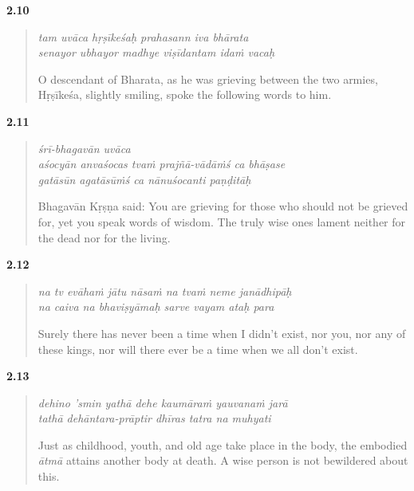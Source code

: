 \par\noindent\textbf{2.10}\par
\begin{verse}
\textit{tam uvāca hṛṣīkeśaḥ prahasann iva bhārata} \\
\textit{senayor ubhayor madhye viṣīdantam idaṁ vacaḥ}

\noindent O descendant of Bharata, as he was grieving between the two armies, Hṛṣīkeśa, slightly smiling, spoke the following words to him.
\end{verse}
\par



\par\noindent\textbf{2.11}\par
\begin{verse}
\textit{śrī-bhagavān uvāca} \\
\textit{aśocyān anvaśocas tvaṁ prajñā-vādāṁś ca bhāṣase} \\
\textit{gatāsūn agatāsūṁś ca nānuśocanti paṇḍitāḥ}

\noindent Bhagavān Kṛṣṇa said: You are grieving for those who should not be grieved for, yet you speak words of wisdom. The truly wise ones lament neither for the dead nor for the living.
\end{verse}
\par



\par\noindent\textbf{2.12}\par
\begin{verse}
\textit{na tv evāhaṁ jātu nāsaṁ na tvaṁ neme janādhipāḥ} \\
\textit{na caiva na bhaviṣyāmaḥ sarve vayam ataḥ para}

\noindent Surely there has never been a time when I didn't exist, nor you, nor any of these kings, nor will there ever be a time when we all don't exist.
\end{verse}
\par



\par\noindent\textbf{2.13}\par
\begin{verse}
\textit{dehino ’smin yathā dehe kaumāraṁ yauvanaṁ jarā} \\
\textit{tathā dehāntara-prāptir dhīras tatra na muhyati}

\noindent Just as childhood, youth, and old age take place in the body, the embodied \textit{ātmā} attains another body at death. A wise person is not bewildered about this.
\end{verse}
\par



